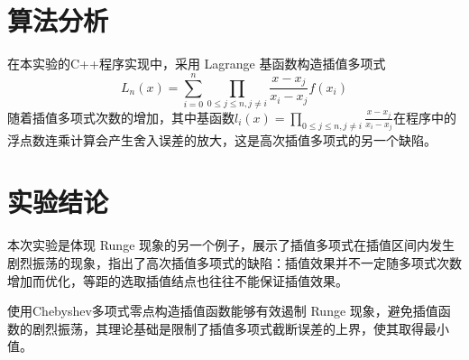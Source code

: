 \documentclass[11pt]{article}
\begin{document}
\section{算法分析}
在本实验的C++程序实现中，采用 Lagrange 基函数构造插值多项式
\begin{equation*}
    L_n(x) = \sum_{i = 0}^n{\prod_{0 \leqslant j \leqslant n, j \ne i}{\frac{x - x_j}{x_i - x_j}}f(x_i)}
\end{equation*}
随着插值多项式次数的增加，其中基函数$l_i(x) = \displaystyle \prod_{0 \leqslant j \leqslant n, j \ne i}{\frac{x - x_j}{x_i - x_j}}$在程序中的浮点数连乘计算会产生舍入误差的放大，这是高次插值多项式的另一个缺陷。

\section{实验结论}
本次实验是体现 Runge 现象的另一个例子，展示了插值多项式在插值区间内发生剧烈振荡的现象，指出了高次插值多项式的缺陷：插值效果并不一定随多项式次数增加而优化，等距的选取插值结点也往往不能保证插值效果。

使用Chebyshev多项式零点构造插值函数能够有效遏制 Runge 现象，避免插值函数的剧烈振荡，其理论基础是限制了插值多项式截断误差的上界，使其取得最小值。
\end{document}

